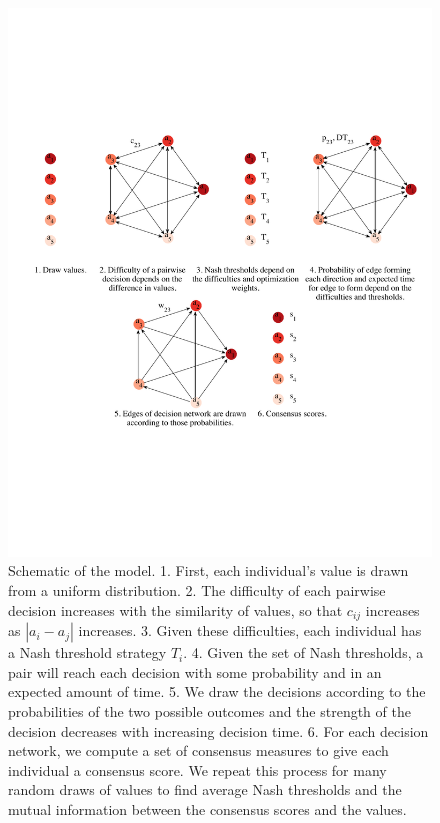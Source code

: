 \documentclass{article}
\begin{document}
\begin{figure}[bp]
\includegraphics[width=6.83in]{cartoon_cropped.pdf}
\caption{\label{cartoon} Schematic of the model. 1. First, each individual's value is drawn from a uniform distribution. 2. The difficulty of each pairwise decision increases with the similarity of values, so that $c_{ij}$ increases as $|a_i-a_j|$ increases. 3. Given these difficulties, each individual has a Nash threshold strategy $T_i$. 4. Given the set of Nash thresholds, a pair will reach each decision with some probability and in an expected amount of time. 5. We draw the decisions according to the probabilities of the two possible outcomes and the strength of the decision decreases with increasing decision time. 6. For each decision network, we compute a set of consensus measures to give each individual a consensus score. We repeat this process for many random draws of values to find average Nash thresholds and the mutual information between the consensus scores and the values. }
\end{figure}
\end{document}
